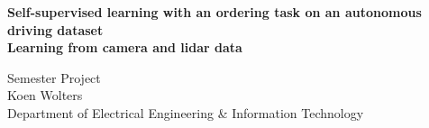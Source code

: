 %

\begin{titlepage}

\thispagestyle{empty}




\vspace*{2cm}
\begin{center}
\Huge{\textbf{Self-supervised learning with an ordering task on an autonomous driving dataset}\\}
\vspace*{3mm}
\Large{\textbf{Learning from camera and lidar data}\\[1cm]}

\large{Semester Project\\[0.8cm]}
\LARGE{Koen Wolters\\}
\normalsize{Department of Electrical Engineering \& Information Technology}
\end{center}

\begin{center}
 




\end{center}
\end{titlepage}
